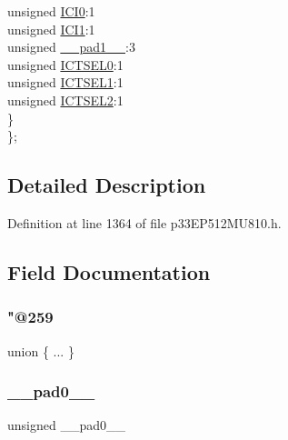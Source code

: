 \begin{DoxyCompactItemize}
\begin{tabbing}
\>\>unsigned \hyperlink{structtag_i_c16_c_o_n1_b_i_t_s_a6f1b5da2706b7c15fc8c9a01a30deaff}{ICI0}:1\\
\>\>unsigned \hyperlink{structtag_i_c16_c_o_n1_b_i_t_s_a7d5c777f0bc43f66f40462f79ed2179c}{ICI1}:1\\
\>\>unsigned \hyperlink{structtag_i_c16_c_o_n1_b_i_t_s_acaf2d0924a107ec6e8d2e31febaf66f9}{\_\_pad1\_\_}:3\\
\>\>unsigned \hyperlink{structtag_i_c16_c_o_n1_b_i_t_s_af6dd4d0e816b18462680d4b22fa926d3}{ICTSEL0}:1\\
\>\>unsigned \hyperlink{structtag_i_c16_c_o_n1_b_i_t_s_aa29140e739d886362537f87d199c4134}{ICTSEL1}:1\\
\>\>unsigned \hyperlink{structtag_i_c16_c_o_n1_b_i_t_s_a47d80892d449e6edbd5ba2ba9ff06deb}{ICTSEL2}:1\\
\>\} \\
\}; \\

\end{tabbing}\end{DoxyCompactItemize}


\subsection{Detailed Description}


Definition at line 1364 of file p33\+E\+P512\+M\+U810.\+h.



\subsection{Field Documentation}
\mbox{\label{structtag_i_c16_c_o_n1_b_i_t_s_ab2c0b57a9820b761904643dfc4e7f3da}} 
\subsubsection{\texorpdfstring{"@259}{@259}}
{\footnotesize\ttfamily union \{ ... \} }

\mbox{\label{structtag_i_c16_c_o_n1_b_i_t_s_adf71f3d8410c1f1dbbc96680a92c49af}} 
\subsubsection{\texorpdfstring{\+\_\+\+\_\+pad0\+\_\+\+\_\+}{\_\_pad0\_\_}}
{\footnotesize\ttfamily unsigned \+\_\+\+\_\+pad0\+\_\+\+\_\+}



